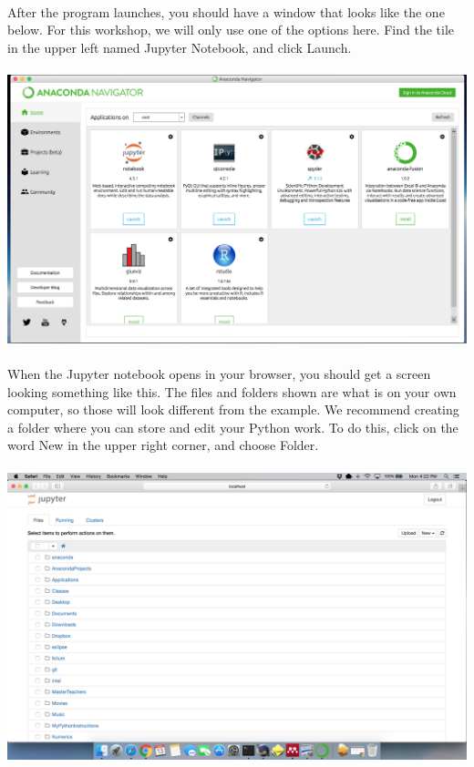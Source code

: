 \documentclass[]{article}
\begin{document}
\paragraph{}
After the program launches, you should have a window that looks like the one below. For this workshop, we will only use one of the options here. Find the tile in the upper left named Jupyter Notebook, and click Launch.
\paragraph{}
\begin{centering}
    \centerline{\includegraphics[scale=0.35]{Screenshot_14.png}}
\end{centering}

\paragraph{}
When the Jupyter notebook opens in your browser, you should get a screen looking something like this. The files and folders shown are what is on your own computer, so those will look different from the example. We recommend creating a folder where you can store and edit your Python work. To do this, click on the word New in the upper right corner, and choose Folder.
\paragraph{}
\begin{centering}
    \centerline{\includegraphics[scale=0.35]{Screenshot_16.png}}
\end{centering}
\end{document}
